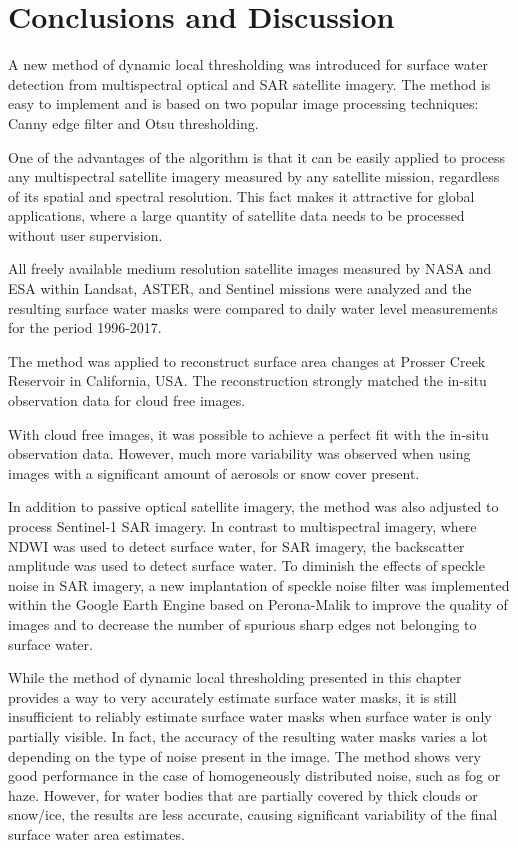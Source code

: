 \section{Conclusions and Discussion}

A new method of dynamic local thresholding was introduced for surface water detection from multispectral optical and SAR satellite imagery. The method is easy to implement and is based on two popular image processing techniques: Canny edge filter and Otsu thresholding. 

One of the advantages of the algorithm is that it can be easily applied to process any multispectral satellite imagery measured by any satellite mission, regardless of its spatial and spectral resolution. This fact makes it attractive for global applications, where a large quantity of satellite data needs to be processed without user supervision. 

All freely available medium resolution satellite images measured by NASA and ESA within Landsat, ASTER, and Sentinel missions were analyzed and the resulting surface water masks were compared to daily water level measurements for the period 1996-2017.

The method was applied to reconstruct surface area changes at Prosser Creek Reservoir in California, USA. The reconstruction strongly matched the in-situ observation data for cloud free images. 

With cloud free images, it was possible to achieve a perfect fit with the in-situ observation data. However, much more variability was observed when using images with a significant amount of aerosols or snow cover present. 

In addition to passive optical satellite imagery, the method was also adjusted to process Sentinel-1 SAR imagery. In contrast to multispectral imagery, where NDWI was used to detect surface water, for SAR imagery, the backscatter amplitude was used to detect surface water. To diminish the effects of speckle noise in SAR imagery, a new implantation of speckle noise filter was implemented within the Google Earth Engine based on Perona-Malik to improve the quality of images and to decrease the number of spurious sharp edges not belonging to surface water. 

While the method of dynamic local thresholding presented in this chapter provides a way to very accurately estimate surface water masks, it is still insufficient to reliably estimate surface water masks when surface water is only partially visible. In fact, the accuracy of the resulting water masks varies a lot depending on the type of noise present in the image. The method shows very good performance in the case of homogeneously distributed noise, such as fog or haze. However, for water bodies that are partially covered by thick clouds or snow/ice, the results are less accurate, causing significant variability of the final surface water area estimates.

